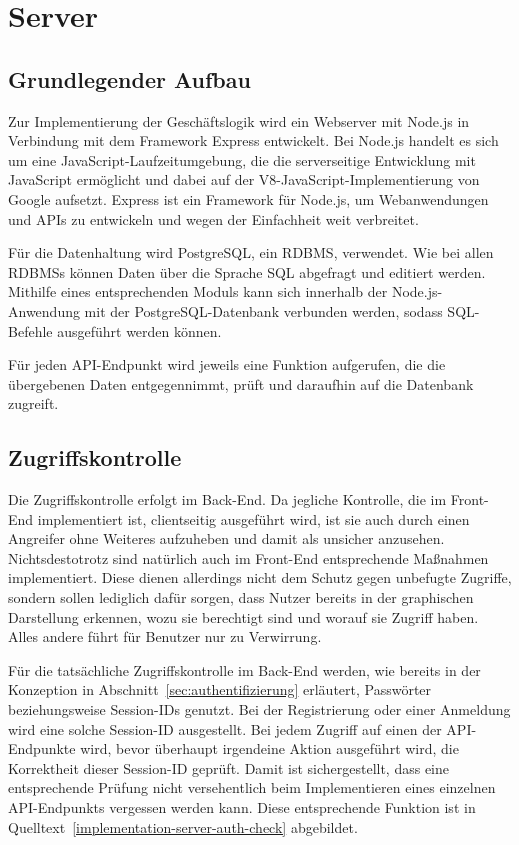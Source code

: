 \section{Server}

\subsection{Grundlegender Aufbau}
Zur Implementierung der Geschäftslogik wird ein Webserver mit Node.js in Verbindung mit dem Framework Express entwickelt.
Bei Node.js handelt es sich um eine JavaScript-Laufzeitumgebung, die die serverseitige Entwicklung mit JavaScript ermöglicht und dabei auf der V8-JavaScript-Implementierung von Google aufsetzt.\autocite[Vgl.][]{nl-openjsfoundation2020nodejs}
Express ist ein Framework für Node.js, um Webanwendungen und \acsp{API} zu entwickeln und wegen der Einfachheit weit verbreitet.\autocite[Vgl.][]{nl-strongloop2017express}

Für die Datenhaltung wird PostgreSQL, ein \ac{RDBMS}, verwendet.
Wie bei allen \acsp{RDBMS} können Daten über die Sprache \acs{SQL} abgefragt und editiert werden.
Mithilfe eines entsprechenden Moduls kann sich innerhalb der Node.js-Anwendung mit der PostgreSQL-Datenbank verbunden werden, sodass \acs{SQL}-Befehle ausgeführt werden können.\autocite[Vgl.][]{nl-carlson2020nodepostgres}

Für jeden \acs{API}-Endpunkt wird jeweils eine Funktion aufgerufen, die die übergebenen Daten entgegennimmt, prüft und daraufhin auf die Datenbank zugreift.

\subsection{Zugriffskontrolle}
Die Zugriffskontrolle erfolgt im Back-End.
Da jegliche Kontrolle, die im Front-End implementiert ist, clientseitig ausgeführt wird, ist sie auch durch einen Angreifer ohne Weiteres aufzuheben und damit als unsicher anzusehen.
Nichtsdestotrotz sind natürlich auch im Front-End entsprechende Maßnahmen implementiert.
Diese dienen allerdings nicht dem Schutz gegen unbefugte Zugriffe, sondern sollen lediglich dafür sorgen, dass Nutzer bereits in der graphischen Darstellung erkennen, wozu sie berechtigt sind und worauf sie Zugriff haben.
Alles andere führt für Benutzer nur zu Verwirrung.

Für die tatsächliche Zugriffskontrolle im Back-End werden, wie bereits in der Konzeption in Abschnitt~\ref{sec:authentifizierung} erläutert, Passwörter beziehungsweise Session-IDs genutzt.
Bei der Registrierung oder einer Anmeldung wird eine solche Session-ID ausgestellt.
Bei jedem Zugriff auf einen der \acs{API}-Endpunkte wird, bevor überhaupt irgendeine Aktion ausgeführt wird, die Korrektheit dieser Session-ID geprüft.
Damit ist sichergestellt, dass eine entsprechende Prüfung nicht versehentlich beim Implementieren eines einzelnen \acs{API}-Endpunkts vergessen werden kann.
Diese entsprechende Funktion ist in Quelltext~\vref{implementation-server-auth-check} abgebildet.

